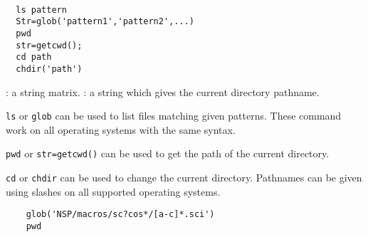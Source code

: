 \begin{mandesc}
   \\ %
   \\ %
   \\ %
   \\ %
   \\ %
   \\ %
\end{mandesc}
\begin{calling_sequence}
\begin{verbatim}
  ls pattern 
  Str=glob('pattern1','pattern2',...)
  pwd  
  str=getcwd();
  cd path 
  chdir('path')
\end{verbatim}
\end{calling_sequence}
\begin{parameters}
  \begin{varlist}
    : a string matrix. 
    : a string which gives the current directory pathname.
  \end{varlist}
\end{parameters}
\begin{mandescription}
  \verb!ls! or \verb!glob! can be used to list files matching 
  given patterns. These command work on all operating systems 
  with the same syntax. 

\noindent  \verb!pwd! or \verb!str=getcwd()! can be used to get the 
  path of the current directory. 

\noindent  \verb!cd! or \verb!chdir! can be used to change the current 
  directory. Pathnames can be given using slashes on all 
  supported operating systems. 
\end{mandescription}
\begin{examples}
  \begin{Verbatim}
    glob('NSP/macros/sc?cos*/[a-c]*.sci')
    pwd 
  \end{Verbatim}
\end{examples}
\begin{manseealso}
\end{manseealso}
